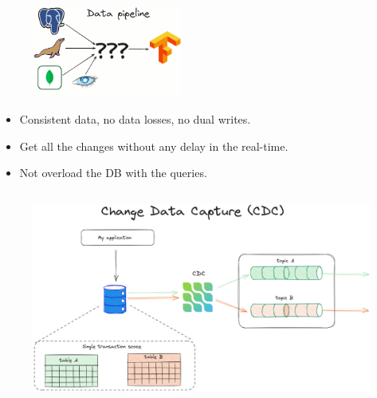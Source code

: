 \documentclass[10pt,utf8]{beamer}
\begin{document}
\begin{frame}
    \begin{figure}
        \centering
        \includegraphics[height=3cm]{./img/dbs_to_tf2.eps}
    \end{figure}
    \begin{itemize}
      \item Consistent data, no data losses, no dual writes.
      \item Get all the changes without any delay in the real-time.
      \item Not overload the DB with the queries.
    \end{itemize}
\end{frame}

\begin{frame}
    \begin{figure}
        \centering
        \includegraphics[height=7cm]{./img/cdc.eps}
    \end{figure}
\end{frame}
\end{document}
